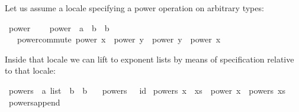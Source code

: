 \begin{isabellebody}
\begin{isamarkuptext}
  Let us assume a locale specifying a power operation on arbitrary
  types:%
\end{isamarkuptext}%
\isamarkuptrue%
%
\isadelimquote
%
\endisadelimquote
%
\isatagquote
{}\isamarkupfalse%
\ power\ {}\isanewline
\ \ \ power\ {}{}\ {}{}a\ {}\ {}b\ {}\ {}b{}\isanewline
\ \ \ power{}commute{}\ {}power\ x\ {}\ power\ y\ {}\ power\ y\ {}\ power\ x{}\isanewline
{}%
\endisatagquote
{\isafoldquote}%
%
\isadelimquote
%
\endisadelimquote
%
\begin{isamarkuptext}%
\noindent Inside that locale we can lift  to exponent
  lists by means of specification relative to that locale:%
\end{isamarkuptext}%
\isamarkuptrue%
%
\isadelimquote
%
\endisadelimquote
%
\isatagquote
{}\isamarkupfalse%
\ powers\ {}{}\ {}{}a\ list\ {}\ {}b\ {}\ {}b{}\ \isanewline
\ \ {}powers\ {}{}\ {}\ id{}\isanewline
{}\ {}powers\ {}x\ {}\ xs{}\ {}\ power\ x\ {}\ powers\ xs{}\isanewline
\isanewline
{}\isamarkupfalse%
\ powers{}append{}\isanewline

\end{isabellebody}
